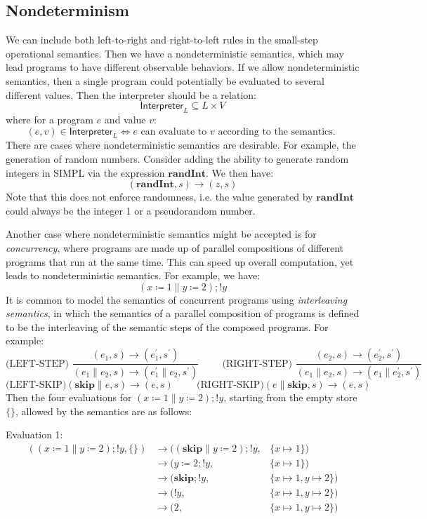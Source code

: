 \subsection{Nondeterminism}
We can include both left-to-right and right-to-left rules in the small-step operational semantics. Then we have a nondeterministic semantics, which may lead programs to have different observable behaviors. If we allow nondeterministic semantics, then a single program could potentially be evaluated to several different values. Then the interpreter should be a relation:
\[
  \textsf{Interpreter}_L \subseteq L \times V
\]
where for a program \(e\) and value \(v\):
\[
  (e, v) \in \textsf{Interpreter}_L \iff e \text{ can evaluate to } v \text{ according to the semantics. } 
\]
There are cases where nondeterministic semantics are desirable. For example, the generation of random numbers. Consider adding the ability to generate random integers in SIMPL via the expression \(\mathbf{randInt}\). We then have:
\[
  (\mathbf{randInt}, s) \to (z, s)
\]
Note that this does not enforce randomness, i.e. the value generated by \(\mathbf{randInt}\) could always be the integer 1 or a pseudorandom number. 

Another case where nondeterministic semantics might be accepted is for \textit{concurrency}, where programs are made up of parallel compositions of different programs that run at the same time. This can speed up overall computation, yet leads to nondeterministic semantics. For example, we have:
\[
  (x \coloneqq 1 \parallel y \coloneqq 2); !y
\]
It is common to model the semantics of concurrent programs using \textit{interleaving semantics}, in which the semantics of a parallel composition of programs is defined to be the interleaving of the semantic steps of the composed programs. For example:
\[
  \text{(LEFT-STEP) } \dfrac{(e_1, s) \to (e_1^{\prime}, s^{\prime})}{(e_1 \parallel e_2, s) \to (e_1^{\prime} \parallel e_2, s^{\prime})} \hspace{1cm} 
  \text{(RIGHT-STEP) } \dfrac{(e_2, s) \to (e_2^{\prime}, s^{\prime})}{(e_1 \parallel e_2, s) \to (e_1 \parallel e_2^{\prime}, s^{\prime})}
\]
\[
  \text{(LEFT-SKIP)} (\mathbf{skip} \parallel e, s) \to (e, s) \hspace{1cm} 
  \text{(RIGHT-SKIP)} (e \parallel \mathbf{skip}, s) \to (e, s)
\]
Then the four evaluations for \((x \coloneqq 1 \parallel y \coloneqq 2); !y\), starting from the empty store \(\{\}\), allowed by the semantics are as follows:

Evaluation 1:
\[
  \begin{aligned}
    ((x \coloneqq 1 \parallel y \coloneqq 2); !y, \{\}) &\to ((\mathbf{skip} \parallel y \coloneqq 2); !y, &\{x \mapsto 1\}) \\
    &\to (y \coloneqq 2; !y, &\{x \mapsto 1\}) \\
    &\to (\mathbf{skip}; !y, &\{x \mapsto 1, y \mapsto 2\}) \\
    &\to (!y, &\{x \mapsto 1, y \mapsto 2\}) \\
    &\to (2, &\{x \mapsto 1, y \mapsto 2\}) \\
  \end{aligned}
\]

